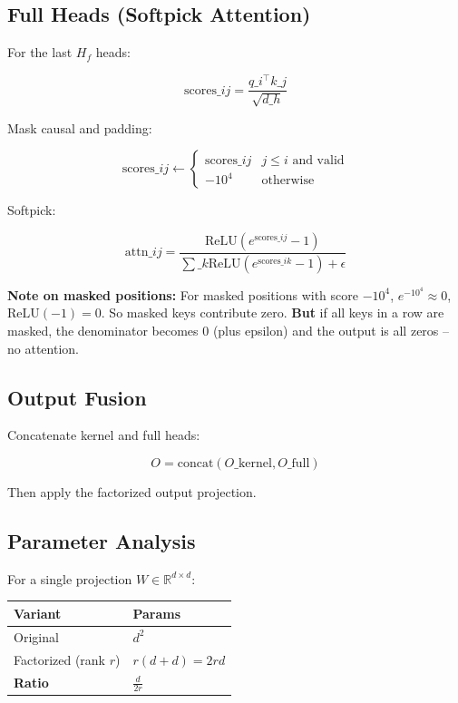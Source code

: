\subsection{Full Heads (Softpick Attention)}

For the last $H_f$ heads:

\[
\text{scores}\_{ij} = \frac{q\_i^\top k\_j}{\sqrt{d\_h}}
\tag{4.7}
\]

Mask causal and padding:

\[
\text{scores}\_{ij} \leftarrow \begin{cases} \text{scores}\_{ij} & j \leq i \text{ and valid} \\ -10^4 & \text{otherwise} \end{cases}
\tag{4.8}
\]

Softpick:

\[
\text{attn}\_{ij} = \frac{\text{ReLU}(e^{\text{scores}\_{ij}} - 1)}{\sum\_k \text{ReLU}(e^{\text{scores}\_{ik}} - 1) + \epsilon}
\tag{4.9}
\]

\textbf{Note on masked positions:} For masked positions with score $-10^4$, 
$e^{-10^4} \approx 0$, $\text{ReLU}(-1) = 0$. So masked keys contribute 
zero. \textbf{But} if all keys in a row are masked, the denominator becomes 0 
(plus epsilon) and the output is all zeros -- no attention.

\subsection{Output Fusion}

Concatenate kernel and full heads:

\[
O = \text{concat}(O\_{\text{kernel}}, O\_{\text{full}})
\tag{4.10}
\]

Then apply the factorized output projection.

\subsection{Parameter Analysis}

For a single projection $W \in \mathbb{R}^{d \times d}$:

\begin{table}[H]
\centering
\small
\begin{tabular}{ll}
\toprule
\textbf{Variant} & \textbf{Params} \\
\midrule
Original & $d^2$ \\
Factorized (rank $r$) & $r(d + d) = 2rd$ \\
\textbf{Ratio} & $\frac{d}{2r}$ \\
\bottomrule
\end{tabular}
\end{table}

